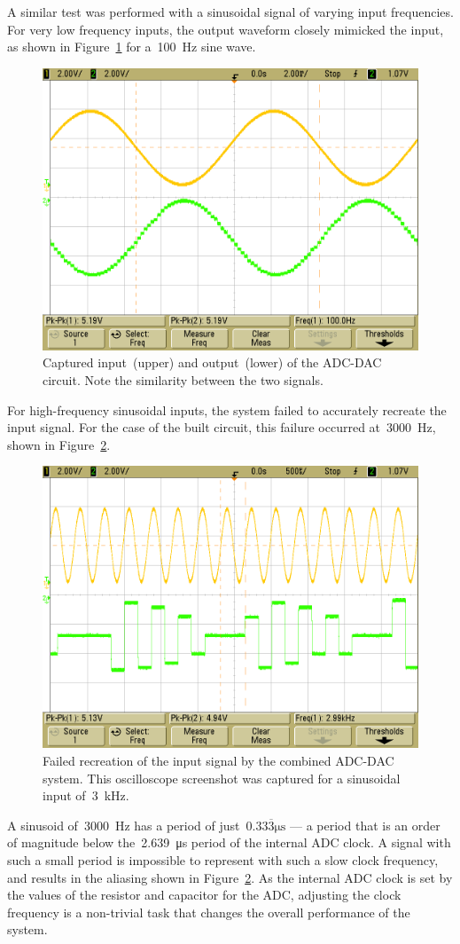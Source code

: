 A similar test was performed with a sinusoidal signal of varying input
frequencies.  For very low frequency inputs, the output waveform closely mimicked
the input, as shown in Figure~\ref{f:100hz} for a~\SI{100}{\hertz} sine wave.
%
\begin{figure}[H]
\centering
	\includegraphics[width=.8\textwidth]{img/shot/sine_100hz.png}
	\parbox{.8\textwidth}{
	\caption[Sinusoidal input --- Low frequency]{Captured input~(upper) and output~(lower) of
	the ADC-DAC circuit.  Note the similarity between the two signals.}
	\label{f:100hz}}
\end{figure}

For high-frequency sinusoidal inputs, the system failed to accurately recreate
the input signal.  For the case of the built circuit, this failure occurred
at~\SI{3000}{\hertz}, shown in Figure~\ref{f:3000hz}.
%
\begin{figure}[H]
\centering
	\includegraphics[width=.8\textwidth]{img/shot/sine_3000hz.png}
	\parbox{.8\textwidth}{
	\caption[Sinusoidal input --- Failure]{Failed recreation of the input
	signal by the combined ADC-DAC system.  This oscilloscope screenshot was
	captured for a sinusoidal input of~\SI{3}{\kilo\hertz}.}
	\label{f:3000hz}}
\end{figure}
%
A sinusoid of~\SI{3000}{\hertz} has a period of
just~$0.33\overline{3}\si{\micro\second}$ --- a period that is an order of
magnitude below the~\SI{2.639}{\micro\second} period of the internal ADC clock.
A signal with such a small period is impossible to represent with such a slow
clock frequency, and results in the aliasing shown in Figure~\ref{f:3000hz}.
As the internal ADC clock is set by the values of the resistor and capacitor
for the ADC, adjusting the clock frequency is a non-trivial task that changes
the overall performance of the system.
